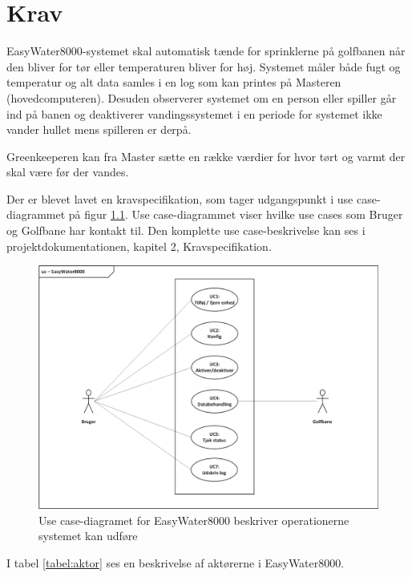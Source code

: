 \chapter{Krav}
EasyWater8000-systemet skal automatisk tænde for sprinklerne på golfbanen når den bliver for tør eller temperaturen bliver for høj. Systemet måler både fugt og temperatur og alt data samles i en log som kan printes på Masteren (hovedcomputeren).  Desuden observerer systemet om en person eller spiller går ind på banen og deaktiverer vandingssystemet i en periode for systemet ikke vander hullet mens spilleren er derpå. 

Greenkeeperen kan fra Master sætte en række værdier for hvor tørt og varmt der skal være før der vandes.

Der er blevet lavet en kravspecifikation, som tager udgangspunkt i use case-diagrammet på figur \ref{lab:usecasediagram}. Use case-diagrammet viser hvilke use cases som Bruger og Golfbane har kontakt til. Den komplette use case-beskrivelse kan ses i projektdokumentationen, kapitel 2, Kravspecifikation. 

\begin{figure}[H] \centering
\vspace*{\fill}
\includegraphics[width=\textwidth]{Billeder/Usecase_Diagram}
\caption{Use case-diagramet for EasyWater8000 beskriver operationerne systemet kan udføre}
\label{lab:usecasediagram}
\vspace*{\fill}
\end{figure}

I tabel \ref{tabel:aktor} ses en beskrivelse af aktørerne i EasyWater8000.

